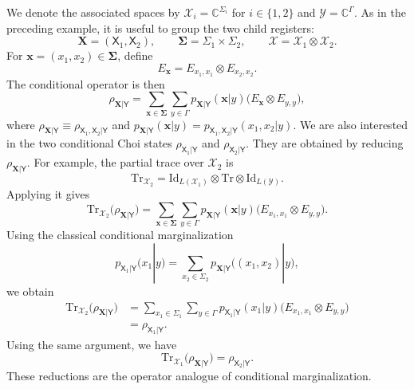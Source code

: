 \documentclass[
    aps,
    pra,
    reprint,
    superscriptaddress,
    nofootinbib
]{revtex4-2}
\theoremstyle{definition}
\theoremstyle{plain}
\begin{document}
We denote the associated spaces by
$\mathcal{X}_{i}=\mathbb{C}^{\Sigma_{i}}$ for $i\in\{1,2\}$ and
$\mathcal{Y}=\mathbb{C}^{\Gamma}$. As in the preceding example, it is useful
to group the two child registers:
\begin{equation}
    \mathbf{X}=(\mathsf{X}_{1},\mathsf{X}_{2}),
    \qquad
    \boldsymbol{\Sigma}=\Sigma_{1}\times\Sigma_{2},
    \qquad
    \mathcal{X}=\mathcal{X}_{1}\otimes\mathcal{X}_{2}.
\end{equation}
For $\mathbf{x}=(x_{1},x_{2})\in\boldsymbol{\Sigma}$, define
\begin{equation}
    E_{\mathbf{x}}
    =
    E_{x_{1},x_{1}}\otimes E_{x_{2},x_{2}}.
\end{equation}
The conditional operator is then
\begin{equation}
    \rho_{\mathbf{X}|\mathsf{Y}}
    =
    \sum_{\mathbf{x}\in\boldsymbol{\Sigma}}
    \sum_{y\in\Gamma}
    p_{\mathbf{X}|\mathsf{Y}}(\mathbf{x}|y)
    \bigl(E_{\mathbf{x}}\otimes E_{y,y}\bigr),
\end{equation}
where
$\rho_{\mathbf{X}|\mathsf{Y}}
\equiv\rho_{\mathsf{X}_{1},\mathsf{X}_{2}|\mathsf{Y}}$ and
$p_{\mathbf{X}|\mathsf{Y}}(\mathbf{x}|y)
=p_{\mathsf{X}_{1},\mathsf{X}_{2}|\mathsf{Y}}(x_{1},x_{2}|y)$.
We are also interested in the two conditional Choi states
$\rho_{\mathsf{X}_{1}|\mathsf{Y}}$ and
$\rho_{\mathsf{X}_{2}|\mathsf{Y}}$. They are obtained by reducing
$\rho_{\mathbf{X}|\mathsf{Y}}$. For example, the partial trace over
$\mathcal{X}_{2}$ is
\begin{equation}
    \mathrm{Tr}_{\mathcal{X}_{2}}
    =
    \mathrm{Id}_{L(\mathcal{X}_{1})}
    \otimes\mathrm{Tr}
    \otimes\mathrm{Id}_{L(\mathcal{Y})}.
\end{equation}
Applying it gives
\begin{equation}
    \mathrm{Tr}_{\mathcal{X}_{2}}
    \bigl(\rho_{\mathbf{X}|\mathsf{Y}}\bigr)=
    \sum_{\mathbf{x}\in\boldsymbol{\Sigma}}
    \sum_{y\in\Gamma}
    p_{\mathbf{X}|\mathsf{Y}}(\mathbf{x}|y)
    \bigl(E_{x_{1},x_{1}}\otimes E_{y,y}\bigr).
\end{equation}
Using the classical conditional marginalization
\begin{equation}
    p_{\mathsf{X}_{1}|\mathsf{Y}}(x_{1}|y)
    =
    \sum_{x_{2}\in\Sigma_{2}}
    p_{\mathbf{X}|\mathsf{Y}}\bigl((x_{1},x_{2})|y\bigr),
\end{equation}
we obtain
\begin{align}
    \mathrm{Tr}_{\mathcal{X}_{2}}
    \bigl(\rho_{\mathbf{X}|\mathsf{Y}}\bigr)
    &=
    \sum_{x_{1}\in\Sigma_{1}}\sum_{y\in\Gamma}
    p_{\mathsf{X}_{1}|\mathsf{Y}}(x_{1}|y)
    \bigl(E_{x_{1},x_{1}}\otimes E_{y,y}\bigr)\\
    &=
    \rho_{\mathsf{X}_{1}|\mathsf{Y}}.
\end{align}
Using the same argument, we have
\begin{equation}
    \mathrm{Tr}_{\mathcal{X}_{1}}
    \bigl(\rho_{\mathbf{X}|\mathsf{Y}}\bigr)
    =
    \rho_{\mathsf{X}_{2}|\mathsf{Y}}.
\end{equation}
These reductions are the operator analogue of conditional marginalization.
\end{document}
